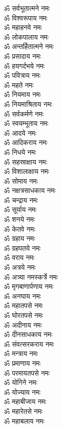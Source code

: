 \begin{multicols}{2}
\begin{flushleft}
ॐ सर्वभूतात्मने नमः\\
ॐ विश्वरूपाय नमः\\
ॐ महाहनवे नमः\\
ॐ लोकपालाय नमः\\
ॐ अन्तर्हितात्मने नमः\\
ॐ प्रसादाय नमः\\
ॐ हयगर्दभये नमः\\
ॐ पवित्राय नमः\hfill{}\\
ॐ महते नमः\\
ॐ नियमाय नमः\\
ॐ नियमाश्रिताय नमः\\
ॐ सर्वकर्मणे नमः\\
ॐ स्वयम्भूताय नमः\\
ॐ आदये नमः\\
ॐ आदिकराय नमः\\
ॐ निधये नमः\\
ॐ सहस्राक्षाय नमः\\
ॐ विशालाक्षाय नमः\hfill{}\\
ॐ सोमाय नमः\\
ॐ नक्षत्रसाधकाय नमः\\
ॐ चन्द्राय नमः\\
ॐ सूर्याय नमः\\
ॐ शनये नमः\\
ॐ केतवे नमः\\
ॐ ग्रहाय नमः\\
ॐ ग्रहपतये नमः\\
ॐ वराय नमः\\
ॐ अत्रये नमः\hfill{}\\
ॐ अत्र्या नमस्कर्त्रे नमः\\
ॐ मृगबाणार्पणाय नमः\\
ॐ अनघाय नमः\\
ॐ महातपसे नमः\\
ॐ घोरतपसे नमः\\
ॐ अदीनाय नमः\\
ॐ दीनसाधकाय नमः\\
ॐ संवत्सरकराय नमः\\
ॐ मन्त्राय नमः\\
ॐ प्रमाणाय नमः\hfill{}\\
ॐ परमायतपसे नमः\\
ॐ योगिने नमः\\
ॐ योज्याय नमः\\
ॐ महाबीजाय नमः\\
ॐ महारेतसे नमः\\
ॐ महाबलाय नमः\\

\end{flushleft}
\end{multicols}
